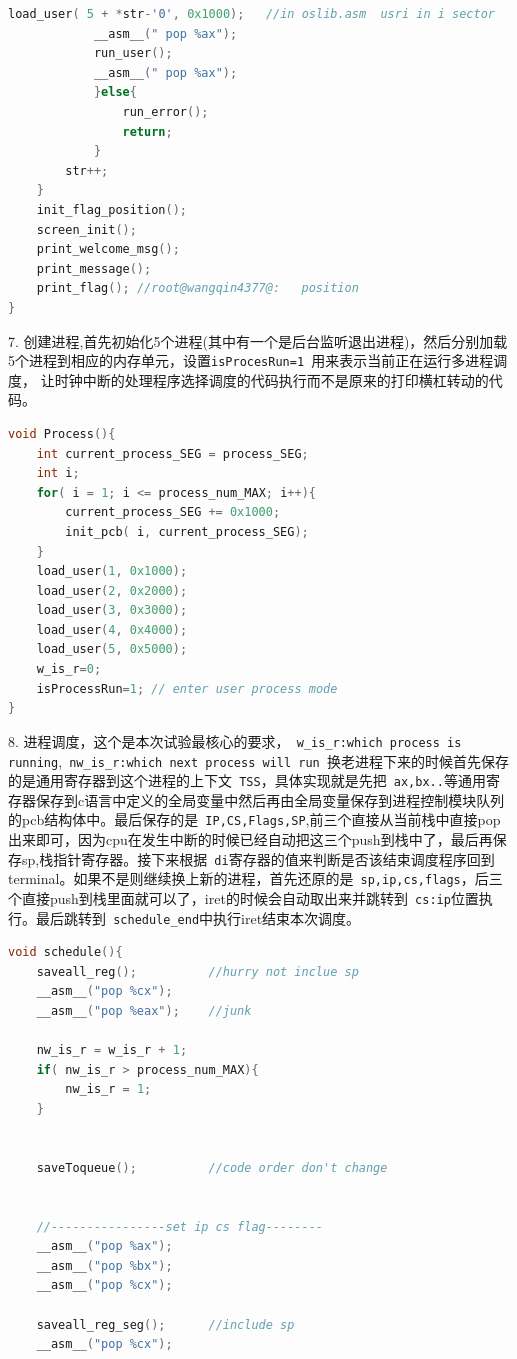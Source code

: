 \documentclass[a4paper]{article}
\begin{document}
{{{\begin{lstlisting}[language={C}]
			load_user( 5 + *str-'0', 0x1000);	//in oslib.asm	usri in i sector 
			__asm__(" pop %ax");
			run_user();
			__asm__(" pop %ax");
			}else{
				run_error();
				return;
			}
		str++;
	}
	init_flag_position();	
	screen_init();
	print_welcome_msg();
	print_message();
	print_flag(); //root@wangqin4377@:   position
}

	\end{lstlisting}}
 7. 创建进程,首先初始化5个进程(其中有一个是后台监听退出进程)，然后分别加载5个进程到相应的内存单元，设置\verb|isProcesRun=1 |用来表示当前正在运行多进程调度，
 让时钟中断的处理程序选择调度的代码执行而不是原来的打印横杠转动的代码。
  {\scriptsize \begin{lstlisting}[language={C}]
void Process(){
	int current_process_SEG = process_SEG;
	int i;
	for( i = 1; i <= process_num_MAX; i++){
		current_process_SEG += 0x1000;
		init_pcb( i, current_process_SEG);	
	}
	load_user(1, 0x1000);
	load_user(2, 0x2000);
	load_user(3, 0x3000);
	load_user(4, 0x4000);
	load_user(5, 0x5000);
	w_is_r=0;
	isProcessRun=1; // enter user process mode
}

	\end{lstlisting}}
 8. 进程调度，这个是本次试验最核心的要求，\verb| w_is_r:which process is running|,\verb| nw_is_r:which next process will run |换老进程下来的时候首先保存的是通用寄存器到这个进程的上下文\verb| TSS|，具体实现就是先把\verb| ax,bx..|等通用寄存器保存到c语言中定义的全局变量中然后再由全局变量保存到进程控制模块队列的pcb结构体中。最后保存的是\verb| IP,CS,Flags,SP|,前三个直接从当前栈中直接pop出来即可，因为cpu在发生中断的时候已经自动把这三个push到栈中了，最后再保存sp,栈指针寄存器。接下来根据\verb| di|寄存器的值来判断是否该结束调度程序回到terminal。如果不是则继续换上新的进程，首先还原的是\verb| sp,ip,cs,flags|，后三个直接push到栈里面就可以了，iret的时候会自动取出来并跳转到\verb| cs:ip|位置执行。最后跳转到\verb| schedule_end|中执行iret结束本次调度。
  {\scriptsize \begin{lstlisting}[language={C}]
void schedule(){
	saveall_reg();			//hurry not inclue sp	
	__asm__("pop %cx");
	__asm__("pop %eax");	//junk

	nw_is_r = w_is_r + 1;
	if( nw_is_r > process_num_MAX){
		nw_is_r = 1;	
	}

	
	saveToqueue();			//code order don't change	


	//----------------set ip cs flag--------
	__asm__("pop %ax");
	__asm__("pop %bx");
	__asm__("pop %cx");

	saveall_reg_seg();		//include sp
	__asm__("pop %cx");


\end{lstlisting}}}}
\end{document}
